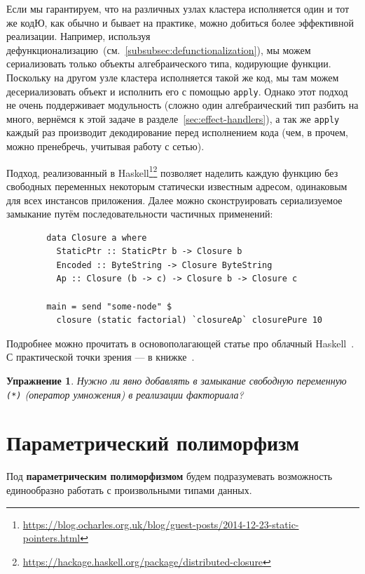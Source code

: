 \documentclass[12pt]{article}
\newcommand{\vocab}[1]{\textbf{#1}} %
\newtheorem{task}{Упражнение}
\begin{document}
    Если мы гарантируем, что на различных узлах кластера исполняется один и тот же кодЮ, как обычно и бывает на практике, можно добиться более эффективной реализации.
    Например, используя дефункционализацию~(см.~\ref{subsubsec:defunctionalization}), мы можем сериализовать только объекты алгебраического типа, кодирующие функции.
    Поскольку на другом узле кластера исполняется такой же код, мы там можем десериализовать объект и исполнить его с помощью \texttt{apply}.
    Однако этот подход не очень поддерживает модульность (сложно один алгебраический тип разбить на много, вернёмся к этой задаче в разделе~\ref{sec:effect-handlers}), а так же \texttt{apply} каждый раз производит декодирование перед исполнением кода (чем, в прочем, можно пренебречь, учитывая работу с сетью).

    Подход, реализованный в Haskell\footnote{\url{https://blog.ocharles.org.uk/blog/guest-posts/2014-12-23-static-pointers.html}}\footnote{\url{https://hackage.haskell.org/package/distributed-closure}} позволяет наделить каждую функцию без свободных переменных некоторым статически известным адресом, одинаковым для всех инстансов приложения.
    Далее можно сконструировать сериализуемое замыкание путём последовательности частичных применений:
    \begin{verbatim}
        data Closure a where
          StaticPtr :: StaticPtr b -> Closure b
          Encoded :: ByteString -> Closure ByteString
          Ap :: Closure (b -> c) -> Closure b -> Closure c

        main = send "some-node" $
          closure (static factorial) `closureAp` closurePure 10
    \end{verbatim}

    Подробнее можно прочитать в основополагающей статье про облачный Haskell~\cite{epstein2011towards}.
    С практической точки зрения --- в книжке~\cite[chapter 16]{marlow2011parallel}.

    \begin{task}
        Нужно ли явно добавлять в замыкание свободную переменную \texttt{(*)} (оператор умножения) в реализации факториала?
    \end{task}


    \clearpage


    \section{Параметрический полиморфизм}

    Под \vocab{параметрическим полиморфизмом} будем подразумевать возможность единообразно работать с произвольными типами данных.
\end{document}
